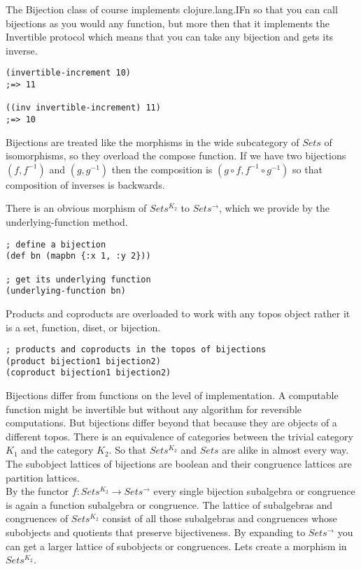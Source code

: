 \documentclass[a4paper,11pt]{report}
\begin{document}
The Bijection class of course implements clojure.lang.IFn so that you can call bijections as you would any function, but more then that it implements the Invertible protocol which means that you can take any bijection and gets its inverse.

\lstset {language=Lisp}
\begin{lstlisting}
(invertible-increment 10)
;=> 11

((inv invertible-increment) 11)
;=> 10
\end{lstlisting}

Bijections are treated like the morphisms in the wide subcategory of $Sets$ of isomorphisms, so they overload the compose function. If we have two bijections $(f,f^{-1})$ and $(g,g^{-1})$ then the composition is $(g \circ f, f^{-1} \circ g^{-1})$ so that composition of inverses is backwards. 

\newpage 

There is an obvious morphism of $Sets^{K_2}$ to $Sets^{\to}$, which we provide by the underlying-function method.

\lstset {language=Lisp}
\begin{lstlisting}
; define a bijection
(def bn (mapbn {:x 1, :y 2}))

; get its underlying function
(underlying-function bn)
\end{lstlisting}

Products and coproducts are overloaded to work with any topos object rather it is a set, function, diset, or bijection.

\lstset {language=Lisp}
\begin{lstlisting}
; products and coproducts in the topos of bijections
(product bijection1 bijection2)
(coproduct bijection1 bijection2)
\end{lstlisting}

Bijections differ from functions on the level of implementation. A computable function might be invertible but without any algorithm for reversible computations. But bijections differ beyond that because they are objects of a different topos. There is an equivalence of categories between the trivial category $K_1$ and the category $K_2$. So that $Sets^{K_2}$ and $Sets$ are alike in almost every way. The subobject lattices of bijections are boolean and their congruence lattices are partition lattices. \\

By the functor $f : Sets^{K_2} \to Sets^{\to}$ every single bijection subalgebra or congruence is again a function subalgebra or congruence. The lattice of subalgebras and congruences of $Sets^{K_2}$ consist of all those subalgebras and congruences whose subobjects and quotients that preserve bijectiveness. By expanding to $Sets^{\to}$ you can get a larger lattice of subobjects or congruences. Lets create a morphism in $Sets^{K_2}$.
\end{document}
